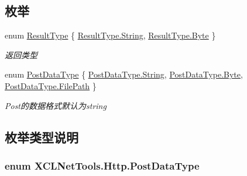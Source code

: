 \subsection*{枚举}
\begin{DoxyCompactItemize}
\item 
enum \hyperlink{namespace_x_c_l_net_tools_1_1_http_a3216524397972f7d0c5733b123216e9e}{Result\-Type} \{ \hyperlink{namespace_x_c_l_net_tools_1_1_http_a3216524397972f7d0c5733b123216e9ea27118326006d3829667a400ad23d5d98}{Result\-Type.\-String}, 
\hyperlink{namespace_x_c_l_net_tools_1_1_http_a3216524397972f7d0c5733b123216e9eaa245c3230debe5c956484ecc6fa93877}{Result\-Type.\-Byte}
 \}
\begin{DoxyCompactList}\small\item\em 返回类型 \end{DoxyCompactList}\item 
enum \hyperlink{namespace_x_c_l_net_tools_1_1_http_ad73fffd49af2087d4f5c0a954d15d08c}{Post\-Data\-Type} \{ \hyperlink{namespace_x_c_l_net_tools_1_1_http_ad73fffd49af2087d4f5c0a954d15d08ca27118326006d3829667a400ad23d5d98}{Post\-Data\-Type.\-String}, 
\hyperlink{namespace_x_c_l_net_tools_1_1_http_ad73fffd49af2087d4f5c0a954d15d08caa245c3230debe5c956484ecc6fa93877}{Post\-Data\-Type.\-Byte}, 
\hyperlink{namespace_x_c_l_net_tools_1_1_http_ad73fffd49af2087d4f5c0a954d15d08ca2fb403e71d8ade2ba79af3f6c4695d09}{Post\-Data\-Type.\-File\-Path}
 \}
\begin{DoxyCompactList}\small\item\em Post的数据格式默认为string \end{DoxyCompactList}\end{DoxyCompactItemize}


\subsection{枚举类型说明}
\hypertarget{namespace_x_c_l_net_tools_1_1_http_ad73fffd49af2087d4f5c0a954d15d08c}{
\subsubsection[{Post\-Data\-Type}]{\setlength{\rightskip}{0pt plus 5cm}enum {\bf X\-C\-L\-Net\-Tools.\-Http.\-Post\-Data\-Type}}}\label{namespace_x_c_l_net_tools_1_1_http_ad73fffd49af2087d4f5c0a954d15d08c}


